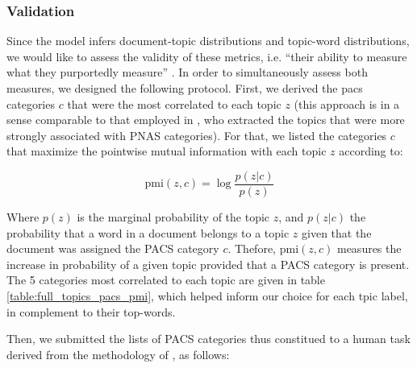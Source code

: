 \documentclass[smallextended]{svjour3}
\begin{document}
\subsubsection{Validation}
\label{appendix:validation}

Since the model infers document-topic distributions and topic-word distributions, we would like to assess the validity of these metrics, i.e. ``their ability to measure what they purportedly measure'' \citep[p.~3240]{Bannigan2009}. In order to simultaneously assess both measures, we designed the following protocol. First, we derived the \gls{pacs} categories $c$ that were the most correlated to each topic $z$ (this approach is in a sense comparable to that employed in \citealt{Griffiths2004}, who extracted the topics that were more strongly associated with PNAS categories). For that, we listed the categories $c$ that maximize the pointwise mutual information with each topic $z$ according to:

\begin{equation}
    \label{eq:pmi_expression}
    \mathrm{pmi}(z,c) = \log \dfrac{p(z|c)}{p(z)}%
\end{equation}

Where $p(z)$ is the marginal probability of the topic $z$, and $p(z|c)$ the probability that a word in a document belongs to a topic $z$ given that the document was assigned the PACS category $c$. Thefore, $\mathrm{pmi}(z,c)$ measures the increase in probability of a given topic provided that a PACS category is present. The 5 categories most correlated to each topic are given in table \ref{table:full_topics_pacs_pmi}, which helped inform our choice for each tpic label, in complement to their top-words.

Then, we submitted the lists of PACS categories thus constitued to a human task derived from the methodology of \citet{Bennett2021}, as follows:
\end{document}
